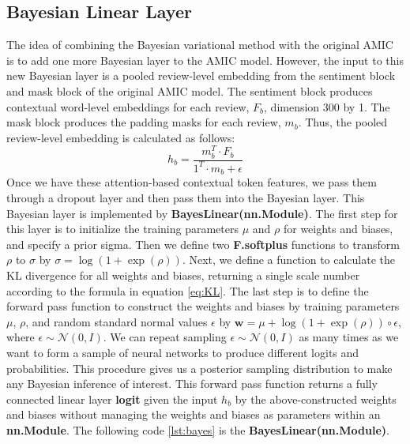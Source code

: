 \documentclass{article}
\begin{document}
\subsection{Bayesian Linear Layer}
The idea of combining the Bayesian variational method with the original AMIC is to add one more Bayesian layer to the AMIC model. However, the input to this new Bayesian layer is a pooled review-level embedding from the sentiment block and mask block of the original AMIC model. The sentiment block produces contextual word-level embeddings for each review, $F_b$, dimension 300 by 1. The mask block produces the padding masks for each review, $m_b$. Thus, the pooled review-level embedding is calculated as follows: $$h_b = \frac{m_b^T \cdot F_b}{1^T\cdot m_b + \epsilon}$$ Once we have these attention-based contextual token features, we pass them through a dropout layer and then pass them into the Bayesian layer. This Bayesian layer is implemented by \textbf{BayesLinear(nn.Module)}. The first step for this layer is to initialize the training parameters $\mu$ and $\rho$ for weights and biases, and specify a prior sigma. Then we define two \textbf{F.softplus} functions to transform $\rho$ to $\sigma$ by $\sigma=\log (1+\exp (\rho))$. Next, we define a function to calculate the KL divergence for all weights and biases, returning a single scale number according to the formula in equation \ref{eq:KL}. The last step is to define the forward pass function to construct the weights and biases by training parameters $\mu$, $\rho$, and random standard normal values $\epsilon$ by $\mathbf{w}=\mu+\log (1+\exp (\rho)) \circ \epsilon$, where $\epsilon \sim \mathcal{N}(0, I)$. We can repeat sampling $\epsilon \sim \mathcal{N}(0, I)$ as many times as we want to form a sample of neural networks to produce different logits and probabilities. This procedure gives us a posterior sampling distribution to make any Bayesian inference of interest. This forward pass function returns a fully connected linear layer \textbf{logit} given the input $h_b$ by the above-constructed weights and biases without managing the weights and biases as parameters within an \textbf{nn.Module}. The following code \ref{lst:bayes} is the \textbf{BayesLinear(nn.Module)}.
\end{document}
